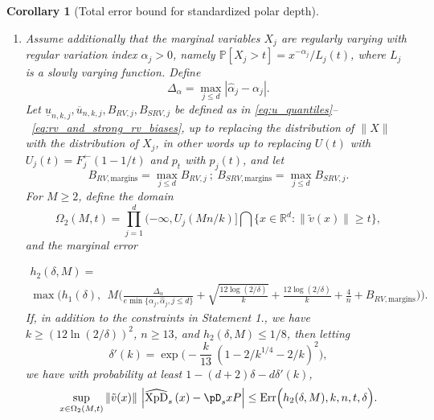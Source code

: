 \documentclass{article}
\numberwithin{equation}{section}
\newtheorem{corollary}{Corollary}[section]
\renewcommand{\P}{\mathbb{P}}
\newcommand{\rset}{\mathbb{R}}
\newcommand{\PP}{\P}%
\newcommand{\XpDsymbol}{\mathrm{XpD}}  %
\newcommand{\coDs}[2]{\pD_s{#1}{#2}}
\newcommand{\hatcoDs}[1]{\widehat{\XpDsymbol}_s\left({#1}\right)}
\begin{document}
\begin{corollary}[Total error bound for standardized polar depth]
\begin{enumerate}
\item Assume additionally that the marginal variables $X_j$ are regularly varying with regular variation index $\alpha_j>0$, namely $\PP[X_j>t ] = x^{-\alpha_j}/L_j(t)$, where $L_j$ is a slowly varying function. Define
  $$
  \Delta_{\alpha} = \max_{j\le d} |\hat \alpha_j - \alpha_j |. 
  $$
  Let $\underline u_{n,k,j}, \overline u _{n,k,j}, B_{RV,j}, B_{SRV,j}$ be defined as in  \eqref{eq:u_quantiles}--~\eqref{eq:rv_and_strong_rv_biases}, up to replacing the distribution of $\|X\|$ with the distribution of $X_j$, in other words up to replacing $U(t)$ with $U_j(t)= F_j^{\leftarrow}(1 - 1/t)$ and $p_t$ with $p_j(t)$, and let
  $$
  B_{RV,\textrm{margins}} = \max_{j\le d} B_{RV,j}~;~
  B_{SRV,\textrm{margins}} = \max_{j\le d} B_{SRV,j}. 
  $$
  For $M\ge 2$, define the domain
  $$
  \Omega_2 (M,t)= \prod_{j=1}^d (-\infty, U_j(M n/k)] \bigcap \{x\in\rset^d: \| \tilde v(x)\| \ge t \},   
  $$
  and the marginal error
  
  \begin{multline*}
    h_{2}(\delta,M) =\\ \max\Bigg(h_1(\delta), 
     ~~ M
                \bigg(\frac{\Delta_{\alpha}}{e \min{\{\alpha_j,
                    \hat{\alpha}_j, j\le d\}}} +
                    \sqrt{\frac{12\log(2/\delta)}{k}} +
                    \frac{12\log(2/\delta)}{k} + \frac{4}{n} +
                B_{RV,\textrm{margins}}\bigg)   \Bigg).
  \end{multline*}
  If, in addition to the constraints in Statement 1., we have $ k\ge (12 \ln(2/\delta))^2$, $n\ge 13$,  and $h_2(\delta,M)\le 1/8$, 
  then %
  letting 
  $$\delta'(k) = \exp\bigg(-
  \frac{k}{13} ~ (1- 2/k^{1/4} - 2/k)^2  
 \bigg),$$ 
 we have with probability at least
  $1 - (d+2)\delta - d\delta'(k)$, 
$$
  \sup_{ x \in \Omega_2(M,t)}  \|\tilde v(x)\|~\Big| \hatcoDs{x} - \coDs{x}{P} \Big| \le \mathrm{Err}\Big(h_2(\delta,M), k,n,t, \delta\Big).  
  $$
  

\end{enumerate}
\end{corollary}
\end{document}
